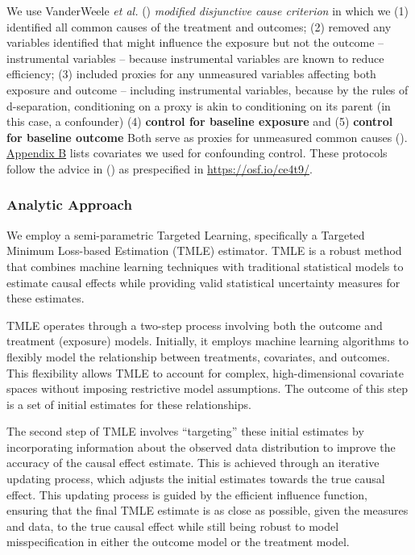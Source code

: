 \documentclass[
  single column]{article}
\begin{document}
We use VanderWeele \emph{et al.} ()
\emph{modified disjunctive cause criterion} in which we (1) identified
all common causes of the treatment and outcomes; (2) removed any
variables identified that might influence the exposure but not the
outcome -- instrumental variables -- because instrumental variables are
known to reduce efficiency; (3) included proxies for any unmeasured
variables affecting both exposure and outcome -- including instrumental
variables, because by the rules of d-separation, conditioning on a proxy
is akin to conditioning on its parent (in this case, a confounder) (4)
\textbf{control for baseline exposure} and (5) \textbf{control for
baseline outcome} Both serve as proxies for unmeasured common causes
().
\hyperref[appendix-demographics]{Appendix B} lists covariates we used
for confounding control. These protocols follow the advice in
() as prespecified
in \url{https://osf.io/ce4t9/}.

\subsubsection{Analytic Approach}\label{analytic-approach}

We employ a semi-parametric Targeted Learning, specifically a Targeted
Minimum Loss-based Estimation (TMLE) estimator. TMLE is a robust method
that combines machine learning techniques with traditional statistical
models to estimate causal effects while providing valid statistical
uncertainty measures for these estimates.

TMLE operates through a two-step process involving both the outcome and
treatment (exposure) models. Initially, it employs machine learning
algorithms to flexibly model the relationship between treatments,
covariates, and outcomes. This flexibility allows TMLE to account for
complex, high-dimensional covariate spaces without imposing restrictive
model assumptions. The outcome of this step is a set of initial
estimates for these relationships.

The second step of TMLE involves ``targeting'' these initial estimates
by incorporating information about the observed data distribution to
improve the accuracy of the causal effect estimate. This is achieved
through an iterative updating process, which adjusts the initial
estimates towards the true causal effect. This updating process is
guided by the efficient influence function, ensuring that the final TMLE
estimate is as close as possible, given the measures and data, to the
true causal effect while still being robust to model misspecification in
either the outcome model or the treatment model.
\end{document}

